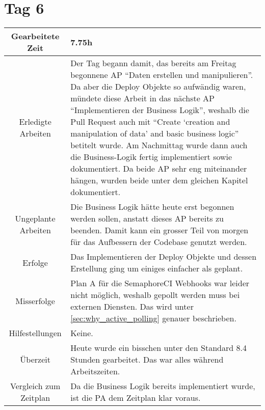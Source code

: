 \section{Tag 6}
\begin{tabularx}{\textwidth}[H]{|c|X|}
  \hline
  Gearbeitete Zeit & 7.75h \\ \hline
  Erledigte Arbeiten & Der Tag begann damit, das bereits am Freitag begonnene AP \enquote{Daten erstellen und
  manipulieren}. Da aber die Deploy Objekte so aufwändig waren, mündete diese Arbeit in das nächste AP
  \enquote{Implementieren der Business Logik}, weshalb die Pull Request auch mit \enquote{Create \enquote{creation
  and manipulation of data} and basic business logic} betitelt wurde. Am Nachmittag wurde dann auch die Business-Logik
  fertig implementiert sowie dokumentiert. Da beide AP sehr eng miteinander hängen, wurden beide unter dem gleichen
  Kapitel dokumentiert. \\ \hline
  Ungeplante Arbeiten & Die Business Logik hätte heute erst begonnen werden sollen, anstatt dieses AP bereits zu
  beenden. Damit kann ein grosser Teil von morgen für das Aufbessern der Codebase genutzt werden. \\ \hline
  Erfolge & Das Implementieren der Deploy Objekte und dessen Erstellung ging um einiges einfacher als geplant. \\ \hline
  Misserfolge & Plan A für die SemaphoreCI Webhooks war leider nicht möglich, weshalb gepollt werden muss bei externen
  Diensten. Das wird unter \ref{sec:why_active_polling} genauer beschrieben. \\ \hline
  Hilfestellungen & Keine. \\ \hline
  Überzeit & Heute wurde ein bisschen unter den Standard 8.4 Stunden gearbeitet. Das war alles während
  Arbeitszeiten. \\ \hline
  Vergleich zum Zeitplan & Da die Business Logik bereits implementiert wurde, ist die PA dem Zeitplan klar
  voraus. \\ \hline
\end{tabularx}

\newpage

